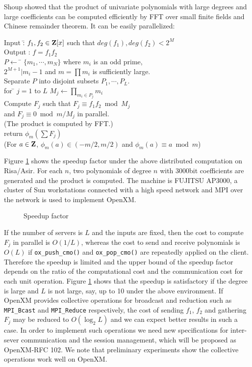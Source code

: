 Shoup \cite{Shoup} showed that the product of univariate polynomials
with large degrees and large coefficients can be computed efficiently
by FFT over small finite fields and Chinese remainder theorem.
It can be easily parallelized:

\begin{tabbing}
Input :\= $f_1, f_2 \in {\bf Z}[x]$ such that $deg(f_1), deg(f_2) < 2^M$\\
Output : $f = f_1f_2$ \\
$P \leftarrow$ \= $\{m_1,\cdots,m_N\}$ where $m_i$ is an odd prime, \\
\> $2^{M+1}|m_i-1$ and $m=\prod m_i $ is sufficiently large. \\
Separate $P$ into disjoint subsets $P_1, \cdots, P_L$.\\
for \= $j=1$ to $L$ $M_j \leftarrow \prod_{m_i\in P_j} m_i$\\
Compute $F_j$ such that $F_j \equiv f_1f_2 \bmod M_j$\\
\> and $F_j \equiv 0 \bmod m/M_j$ in parallel.\\
\> (The product is computed by FFT.)\\
return $\phi_m(\sum F_j)$\\
(For $a \in {\bf Z}$, $\phi_m(a) \in (-m/2,m/2)$ and $\phi_m(a)\equiv a \bmod m$)
\end{tabbing}

Figure \ref{speedup}
shows the speedup factor under the above distributed computation
on Risa/Asir. For each $n$, two polynomials of degree $n$
with 3000bit coefficients are generated and the product is computed.
The machine is FUJITSU AP3000,
a cluster of Sun workstations connected with a high speed network 
and MPI over the network is used to implement OpenXM.
\begin{figure}[htbp]
\epsfxsize=8.5cm
\caption{Speedup factor}
\label{speedup}
\end{figure}

If the number of servers is $L$ and the inputs are fixed, then the cost to
compute $F_j$ in parallel is $O(1/L)$, whereas the cost
to send and receive polynomials is $O(L)$ if {\tt ox\_push\_cmo()} and
{\tt ox\_pop\_cmo()} are repeatedly applied on the client.
Therefore the speedup is limited and the upper bound of
the speedup factor depends on the ratio of 
the computational cost and the communication cost for each unit operation.
Figure \ref{speedup} shows that 
the speedup is satisfactory if the degree is large and $L$
is not large, say, up to 10 under the above environment.
If OpenXM provides collective operations for broadcast and reduction
such as {\tt MPI\_Bcast} and {\tt MPI\_Reduce} respectively, the cost of 
sending $f_1$, $f_2$ and gathering $F_j$ may be reduced to $O(\log_2L)$
and we can expect better results in such a case. In order to implement
such operations we need new specifications for inter-sever communication
and the session management, which will be proposed as OpenXM-RFC 102.
We note that preliminary experiments show the collective operations
work well on OpenXM.

